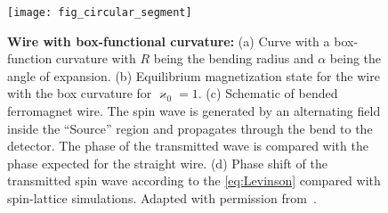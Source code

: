 
\begin{figure}[b]
	\begin{center}
		\texttt{[image: fig\_circular\_segment]}
	\end{center}
	\caption{
		\textbf{Wire with box-functional curvature:}
		(a) Curve with a box-function curvature with $R$ being the bending radius and $\alpha$ being the angle of expansion. 
		(b) Equilibrium magnetization state for the wire with the box curvature for	$\varkappa_0= 1$.
		(c) Schematic of bended ferromagnet wire. The spin wave is generated by an alternating field inside the ``Source'' region and propagates through the bend to  the detector. The phase of the transmitted wave is compared with the phase expected for the straight wire. 
		(d) Phase shift of the transmitted spin wave according to the \eqref{eq:Levinson} compared with spin-lattice simulations. Adapted with permission from~\cite{Gaididei18a}.}
	\label{fig:Circular_segment_1}
\end{figure}

